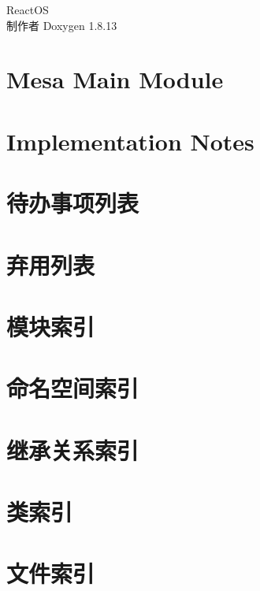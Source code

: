 \documentclass[twoside]{book}
\newcommand{\+}{\discretionary{\mbox{\scriptsize$\hookleftarrow$}}{}{}}
\newcommand{\clearemptydoublepage}{%
  \newpage{\pagestyle{empty}\cleardoublepage}%
}
\begin{document}
\hypersetup{pageanchor=false,
             bookmarksnumbered=true,
             pdfencoding=unicode
            }
\begin{titlepage}
\vspace*{7cm}
\begin{center}%
{\Large React\+OS }\\
\vspace*{1cm}
{\large 制作者 Doxygen 1.8.13}\\
\end{center}
\end{titlepage}
\clearemptydoublepage
{}
\tableofcontents
\clearemptydoublepage
{}
\hypersetup{pageanchor=true}

\chapter{Mesa Main Module}
\label{index}\hypertarget{index}{}
\chapter{Implementation Notes}
\label{_d_m_a}

\chapter{待办事项列表}
\label{todo}

\chapter{弃用列表}
\label{deprecated}

\chapter{模块索引}

\chapter{命名空间索引}

\chapter{继承关系索引}

\chapter{类索引}

\chapter{文件索引}

\end{document}

